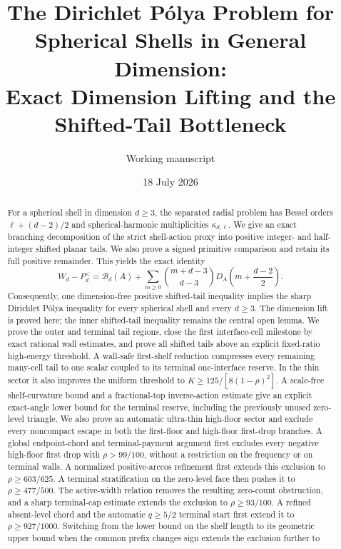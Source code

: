 \documentclass[11pt]{article}
\title{The Dirichlet P\'olya Problem for Spherical Shells in General
Dimension:\\Exact Dimension Lifting and the Shifted-Tail Bottleneck}
\author{Working manuscript}
\date{18 July 2026}
\theoremstyle{remark}
\begin{document}
\maketitle

\begin{abstract}
For a spherical shell in dimension $d\geq3$, the separated radial problem
has Bessel orders $\ell+(d-2)/2$ and spherical-harmonic multiplicities
$\kappa_{d,\ell}$.  We give an exact branching decomposition of the strict
shell-action proxy into positive integer- and half-integer shifted planar
tails.  We also prove a signed primitive comparison and retain its full
positive remainder.  This yields the exact identity
\[
 W_d-P_d^{<}=\mathcal B_d(A)+
 \sum_{m\geq0}\binom{m+d-3}{d-3}D_A\left(m+\frac{d-2}{2}\right).
\]
Consequently, one dimension-free positive shifted-tail inequality implies
the sharp Dirichlet P\'olya inequality for every spherical shell and every
$d\geq3$.  The dimension lift is proved here; the inner shifted-tail
inequality remains the central open lemma.  We prove the outer and terminal
tail regions, close the first interface-cell milestone by exact rational
wall estimates, and prove all shifted tails above an explicit fixed-ratio
high-energy threshold.  A wall-safe first-shelf reduction compresses every
remaining many-cell tail to one scalar coupled to its terminal
one-interface reserve.  In the thin sector it also improves the uniform
threshold to $K\geq125/[8(1-\rho)^2]$.  A scale-free shelf-curvature
bound and a fractional-top inverse-action estimate give an explicit
exact-angle lower bound for the terminal reserve, including the previously
unused zero-level triangle.  We also prove an automatic ultra-thin
 high-floor sector and exclude every noncompact escape in both the
 first-floor and high-floor first-drop branches.  A global endpoint-chord
 and terminal-payment argument first excludes every negative high-floor
 first drop with $\rho>99/100$, without a restriction on the frequency or
 on terminal walls.  A normalized positive-arccos refinement first extends
 this exclusion to $\rho\geq603/625$.  A terminal stratification on the
 zero-level face then pushes it to $\rho\geq477/500$.  The active-width
 relation removes the resulting zero-count obstruction, and a sharp
 terminal-cap estimate extends the exclusion to $\rho\geq93/100$.
 A refined absent-level chord and the automatic $q\geq5/2$ terminal
 start first extend it to $\rho\geq927/1000$.  Switching from the lower
 bound on the shelf length to its geometric upper bound when the common
 prefix changes sign extends the exclusion further to

\end{abstract}
\end{document}
